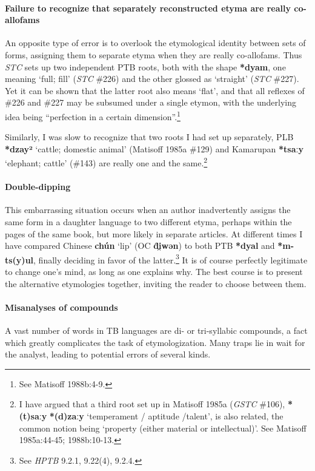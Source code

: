 \paragraph{Failure to recognize that separately reconstructed etyma are really co-allofams}

An opposite type of error is to overlook the etymological identity between sets
of forms, assigning them to separate etyma when they are really co-allofams.
Thus \textit{STC} sets up two independent PTB roots, both with the shape \textbf{*dyam}, one
meaning ‘full; fill’ (\textit{STC} \#226) and the other glossed as ‘straight’ (\textit{STC} \#227).
Yet it can be shown that the latter root also means ‘flat’, and that all
reflexes of \#226 and \#227 may be subsumed under a single etymon, with the
underlying idea being “perfection in a certain dimension”.\footnote{See Matisoff
1988b:4-9.}


Similarly, I was slow to recognize that two roots I had set up separately,
PLB \textbf{*dzay²} ‘cattle; domestic animal’ (Matisoff 1985a \#129)
and Kamarupan \textbf{*tsaːy} ‘elephant;
cattle’ (\#143) are really one and the same.\footnote{I have argued that a
third root set up in Matisoff 1985a (\textit{GSTC} \#106), \textbf{*(t)saːy}  \textbf{*(d)zaːy} ‘temperament / aptitude
/talent’, is also related, the common notion being ‘property (either material or
intellectual)’. See Matisoff 1985a:44-45; 1988b:10-13.}

\paragraph{Double-dipping}
This embarrassing situation occurs when an author inadvertently assigns the same
form in a daughter language to two different etyma, perhaps within the pages of
the same book, but more likely in separate articles. At different times I have
compared Chinese \textbf{chún}  ‘lip’ (OC \textbf{d̑i̯wən}) to both PTB \textbf{*dyal}
and \textbf{*m-ts(y)ul}, finally deciding in favor of the latter.\footnote{See \textit{HPTB}
9.2.1, 9.22(4), 9.2.4.}  It
is of course perfectly legitimate to change one’s mind, as long as one explains
why. The best course is to present the alternative etymologies together,
inviting the reader to choose between them.

\paragraph{Misanalyses of compounds}
A vast number of words in TB languages are di- or tri-syllabic compounds, a fact
which greatly complicates the task of etymologization.  Many traps lie in wait
for the analyst, leading to potential errors of several kinds.

